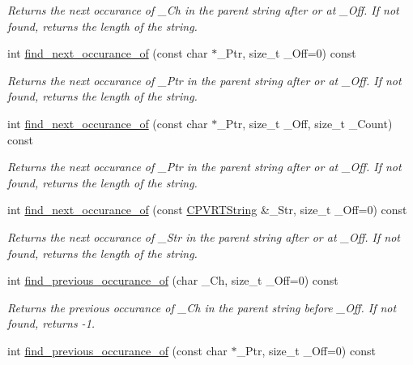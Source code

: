 \begin{DoxyCompactItemize}
\begin{DoxyCompactList}\small\item\em Returns the next occurance of \+\_\+\+Ch in the parent string after or at \+\_\+\+Off. If not found, returns the length of the string. \end{DoxyCompactList}\item 
int \hyperlink{class_c_p_v_r_t_string_ac518d3b498634b68f2965578607e32f5}{find\+\_\+next\+\_\+occurance\+\_\+of} (const char $\ast$\+\_\+\+Ptr, size\+\_\+t \+\_\+\+Off=0) const 
\begin{DoxyCompactList}\small\item\em Returns the next occurance of \+\_\+\+Ptr in the parent string after or at \+\_\+\+Off. If not found, returns the length of the string. \end{DoxyCompactList}\item 
int \hyperlink{class_c_p_v_r_t_string_a3cdaf12aee3cf4a6daeeffa79cdd7cdd}{find\+\_\+next\+\_\+occurance\+\_\+of} (const char $\ast$\+\_\+\+Ptr, size\+\_\+t \+\_\+\+Off, size\+\_\+t \+\_\+\+Count) const 
\begin{DoxyCompactList}\small\item\em Returns the next occurance of \+\_\+\+Ptr in the parent string after or at \+\_\+\+Off. If not found, returns the length of the string. \end{DoxyCompactList}\item 
int \hyperlink{class_c_p_v_r_t_string_a265f25012eee141cfb617ce84f57603e}{find\+\_\+next\+\_\+occurance\+\_\+of} (const \hyperlink{class_c_p_v_r_t_string}{C\+P\+V\+R\+T\+String} \&\+\_\+\+Str, size\+\_\+t \+\_\+\+Off=0) const 
\begin{DoxyCompactList}\small\item\em Returns the next occurance of \+\_\+\+Str in the parent string after or at \+\_\+\+Off. If not found, returns the length of the string. \end{DoxyCompactList}\item 
int \hyperlink{class_c_p_v_r_t_string_a1d26b71c01436ae0d17e3c53abdf1a2e}{find\+\_\+previous\+\_\+occurance\+\_\+of} (char \+\_\+\+Ch, size\+\_\+t \+\_\+\+Off=0) const 
\begin{DoxyCompactList}\small\item\em Returns the previous occurance of \+\_\+\+Ch in the parent string before \+\_\+\+Off. If not found, returns -\/1. \end{DoxyCompactList}\item 
int \hyperlink{class_c_p_v_r_t_string_a35d45d2afafb7fbbd60cadea190cd4aa}{find\+\_\+previous\+\_\+occurance\+\_\+of} (const char $\ast$\+\_\+\+Ptr, size\+\_\+t \+\_\+\+Off=0) const 

\end{DoxyCompactItemize}
